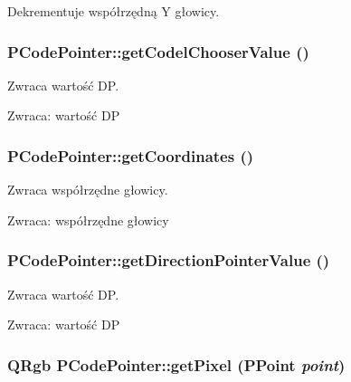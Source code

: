 Dekrementuje współrzędną Y głowicy. \hypertarget{classPCodePointer_529b0f2f65c1d17082d755813fec0194}{
\subsubsection[{getCodelChooserValue}]{ PCodePointer::getCodelChooserValue ()}}
\label{classPCodePointer_529b0f2f65c1d17082d755813fec0194}


Zwraca wartość DP. \begin{Desc}
\item[Zwraca:]wartość DP \end{Desc}
\hypertarget{classPCodePointer_c792e5bc527542482542ed22acc9cca4}{
\subsubsection[{getCoordinates}]{ PCodePointer::getCoordinates ()}}
\label{classPCodePointer_c792e5bc527542482542ed22acc9cca4}


Zwraca współrzędne głowicy. \begin{Desc}
\item[Zwraca:]współrzędne głowicy \end{Desc}
\hypertarget{classPCodePointer_e0461a3d72af876b5b3c838a8b45a729}{
\subsubsection[{getDirectionPointerValue}]{ PCodePointer::getDirectionPointerValue ()}}
\label{classPCodePointer_e0461a3d72af876b5b3c838a8b45a729}


Zwraca wartość DP. \begin{Desc}
\item[Zwraca:]wartość DP \end{Desc}
\hypertarget{classPCodePointer_e9f3396a98b84d090e820ad37c6dca21}{
\subsubsection[{getPixel}]{\setlength{\rightskip}{0pt plus 5cm}QRgb PCodePointer::getPixel ({\bf PPoint} {\em point})}}
\label{classPCodePointer_e9f3396a98b84d090e820ad37c6dca21}


